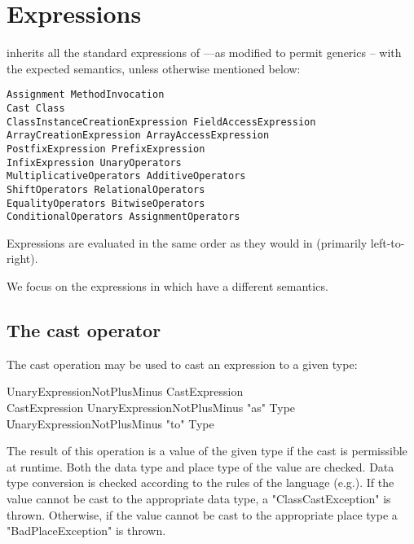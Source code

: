 \section{Expressions}\label{XtenExpressions}

{}\Xten{} inherits all the standard expressions of \Java{}
\cite[\S~15]{jls2}---as modified to permit generics \cite{gjspec} --
with the expected semantics, unless otherwise mentioned below:

\begin{verbatim}
Assignment MethodInvocation 
Cast Class
ClassInstanceCreationExpression FieldAccessExpression   
ArrayCreationExpression ArrayAccessExpression
PostfixExpression PrefixExpression 
InfixExpression UnaryOperators
MultiplicativeOperators AdditiveOperators 
ShiftOperators RelationalOperators  
EqualityOperators BitwiseOperators
ConditionalOperators AssignmentOperators
\end{verbatim}

Expressions are evaluated in the same order as they would in \java{}
(primarily
left-to-right).\label{FieldAccess}\label{ClassCreation}\label{MethodInvocation}

We focus on the expressions in \Xten{} which have a different
semantics.

\subsection{The cast operator}\label{ClassCast}

The cast operation may be used to cast an expression to a given type:
\begin{grammar}
UnaryExpressionNotPlusMinus \: CastExpression \\
CastExpression \: UnaryExpressionNotPlusMinus \xcd"as" Type \\
\| UnaryExpressionNotPlusMinus \xcd"to" Type \\
\end{grammar}

The result of this operation is a value of the given type if the cast
is permissible at runtime. Both the data type and place type of the
value are checked. Data type conversion is checked according to the
rules of the \java{} language (e.g.{}\cite[\S 5.5]{jls2}). If the
value cannot be cast to the appropriate data type, a
\xcd"ClassCastException"
is thrown. Otherwise, if the value cannot be cast to the
appropriate place type a \xcd"BadPlaceException" is thrown. 

